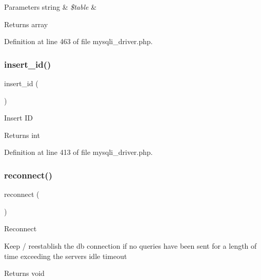 \begin{DoxyParams}[1]{Parameters}
string & {\em \$table} & \\
\hline
\end{DoxyParams}
\begin{DoxyReturn}{Returns}
array 
\end{DoxyReturn}


Definition at line 463 of file mysqli\+\_\+driver.\+php.

\mbox{\label{class_c_i___d_b__mysqli__driver_a933f2cde8dc7f87875e257d0a4902e99}} 
\subsubsection{\texorpdfstring{insert\_id()}{insert\_id()}}
{\footnotesize\ttfamily insert\+\_\+id (\begin{DoxyParamCaption}{ }\end{DoxyParamCaption})}

Insert ID

\begin{DoxyReturn}{Returns}
int 
\end{DoxyReturn}


Definition at line 413 of file mysqli\+\_\+driver.\+php.

\mbox{\label{class_c_i___d_b__mysqli__driver_a57c19c642ab3023e28d10c50f86ff0a8}} 
\subsubsection{\texorpdfstring{reconnect()}{reconnect()}}
{\footnotesize\ttfamily reconnect (\begin{DoxyParamCaption}{ }\end{DoxyParamCaption})}

Reconnect

Keep / reestablish the db connection if no queries have been sent for a length of time exceeding the server\textquotesingle{}s idle timeout

\begin{DoxyReturn}{Returns}
void 
\end{DoxyReturn}


